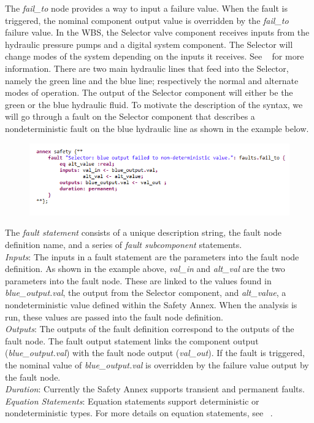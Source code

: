 The \textit{fail\_to} node provides a way to input a failure value. When the fault is triggered, the nominal component output value is overridden by the \textit{fail\_to} failure value. In the WBS, the Selector valve component receives inputs from the hydraulic pressure pumps and a digital system component. The Selector will change modes of the system depending on the inputs it receives. See ~\cite{AIR6110,Stewart17:IMBSA} for more information. There are two main hydraulic lines that feed into the Selector, namely the green line and the blue line; respectively the normal and alternate modes of operation. The output of the Selector component will either be the green or the blue hydraulic fluid. To motivate the description of the syntax, we will go through a fault on the Selector component that describes a nondeterministic fault on the blue hydraulic line as shown in the example below.
\begin{figure}[h!]
\vspace{-0.17in}
\begin{center}
\includegraphics[trim=0 15 0 11,clip,width=1.0\textwidth]{images/annex.png}
\end{center}
\vspace{-0.40in}
\end{figure}

The \textit{fault statement} consists of a unique description string, the fault node definition name, and a series of \textit{fault subcomponent} statements. \\
\textit{Inputs}: The inputs in a fault statement are the parameters into the fault node definition. As shown in the example above, \textit{val\_in} and \textit{alt\_val} are the two parameters into the fault node. These are linked to the values found in \textit{blue\_output.val}, the output from the Selector component, and \textit{alt\_value}, a nondeterministic value defined within the Safety Annex. When the analysis is run, these values are passed into the fault node definition.\\
\textit{Outputs}: The outputs of the fault definition correspond to the outputs of the fault node. The fault output statement links the component output (\textit{blue\_output.val}) with the fault node output (\textit{val\_out}). If the fault is triggered, the nominal value of \textit{blue\_output.val} is overridden by the failure value output by the fault node.\\
\textit{Duration}: Currently the Safety Annex supports transient and permanent faults.\\
\textit{Equation Statements}: Equation statements support deterministic or nondeterministic types. For more details on equation statements, see ~\cite{NFM2012:CoGaMiWhLaLu}.\\





